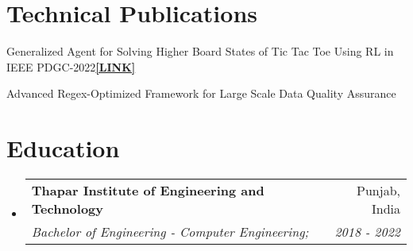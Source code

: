 \documentclass[a4paper,20pt]{article}
\makeatletter
\newcommand{\resumeSubheading}[4]{
  \vspace{-1pt}\item
    \begin{tabular*}{0.97\textwidth}{l@{\extracolsep{\fill}}r}
      \textbf{#1} & #2 \\
      \textit{#3} & \textit{#4} \\
    \end{tabular*}\vspace{-5pt}
}
\newcommand{\resumeSubHeadingListStart}{\begin{itemize}[leftmargin=*]}
\newcommand{\resumeSubHeadingListEnd}{\end{itemize}}
\makeatother
\begin{document}
\section{Technical Publications}
\begin{description}[font=$\bullet$]
\item {Generalized Agent for Solving Higher Board States of Tic Tac Toe Using RL in IEEE PDGC-2022}\textbf{\href{https://arxiv.org/abs/2212.12252}{[LINK]}}
\item {Advanced Regex-Optimized Framework for Large Scale Data Quality Assurance}

\vspace{-5pt}



\end{description}

\vspace{+5pt}
\section{Education}
  \resumeSubHeadingListStart
    \resumeSubheading
      {Thapar Institute of Engineering and Technology}{Punjab, India}
      {Bachelor of Engineering - Computer Engineering;}{2018 - 2022}

    \resumeSubHeadingListEnd

\vspace{-5pt}
\end{document}
